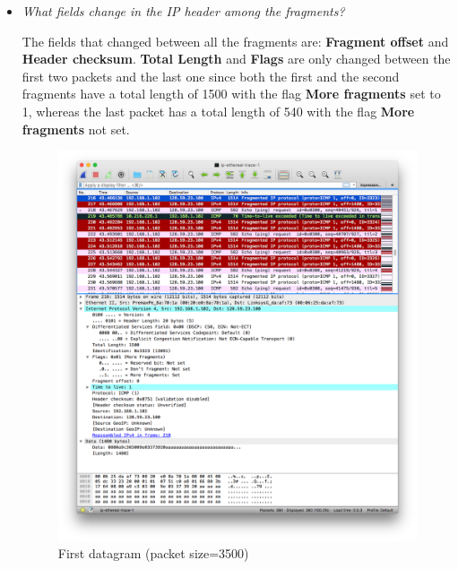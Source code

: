 \documentclass[11pt]{article}
\begin{document}
\begin{itemize}
	\item
		\textit{What fields change in the IP header among the fragments?}
		\par The fields that changed between all the fragments are: \textbf{Fragment offset} and \textbf{Header checksum}. \textbf{Total Length} and \textbf{Flags} are only changed between the first two packets and the last one since both the first and the second fragments have a total length of 1500 with the flag \textbf{More fragments} set to 1, whereas the last packet has a total length of 540 with the flag \textbf{More fragments} not set.
		
		\begin{figure}[H]
		\centering
		\caption{First datagram (packet size=3500)}
		\includegraphics[width=\textwidth]{04}
		\end{figure}
		

\end{itemize}
\end{document}
